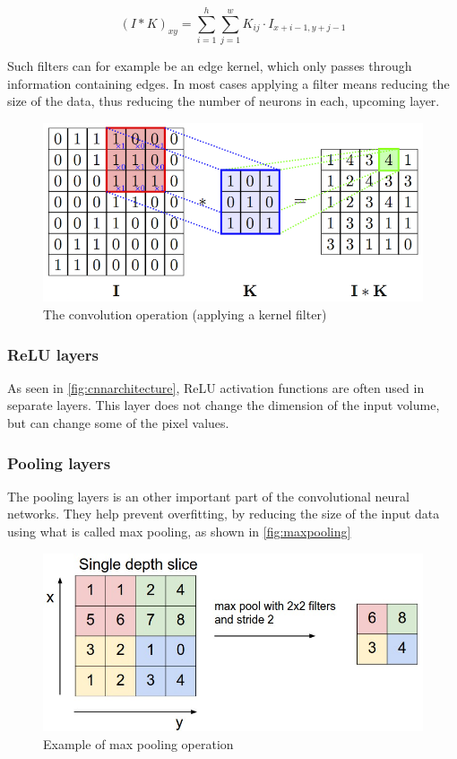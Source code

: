 \begin{equation}\label{eq:convop}
(I*K)_{xy} = \sum_{i=1}^{h}\sum_{j=1}^{w}K_{ij} \cdot I_{x+i-1,y+j-1}
\end{equation}

Such filters can for example be an edge kernel, which only passes through information containing edges. In most cases applying a filter means reducing the size of the data, thus reducing the number of neurons in each, upcoming layer.

\begin{figure}[!h]
	\centering
	\includegraphics[scale=1.5]{fig/kernel_filter.png}
	\caption{The convolution operation (applying a kernel filter) \cite{Cambridge2017}}
	\label{fig:cnnarchitecture}
\end{figure}

\subsubsection{ReLU layers}
As seen in \autoref{fig:cnnarchitecture}, ReLU activation functions are often used in separate layers. This layer does not change the dimension of the input volume, but can change some of the pixel values.

\subsubsection{Pooling layers}
The pooling layers is an other important part of the convolutional neural networks. They help prevent overfitting, by reducing the size of the input data using what is called max pooling, as shown in \autoref{fig:maxpooling}
\begin{figure}[!h]
	\centering
	\includegraphics[scale=0.5]{fig/pooling_layer.jpeg}
	\caption{Example of max pooling operation \cite{Karpathy2017}}
	\label{fig:maxpooling}
\end{figure}

